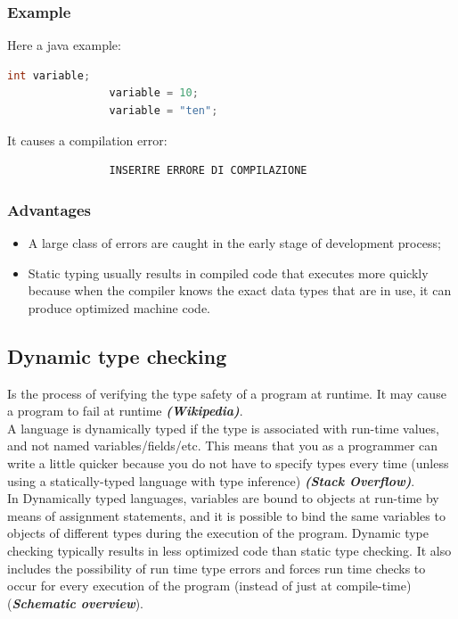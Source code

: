 \documentclass[12pt]{article}
\begin{document}
		\subsubsection{Example}	
			Here a java example: 
			\begin{lstlisting}[language=Java]
				int variable;
				variable = 10;
				variable = "ten";
			\end{lstlisting}
			It causes a compilation error:
			\begin{lstlisting}
				INSERIRE ERRORE DI COMPILAZIONE
			\end{lstlisting}
			
		\subsubsection{Advantages}
			\begin{itemize}
				\item  A large class of errors are caught in the early stage of development process;
				\item Static typing usually results in compiled code that executes more quickly because when the compiler knows the exact data types that are in use, it can produce optimized machine code.
			\end{itemize}
			
	\subsection{Dynamic type checking}
		Is the process of verifying the type safety of a program at runtime. It may cause a program to fail at runtime \textit{\textbf{(Wikipedia)}}.\\
		A language is dynamically typed if the type is associated with run-time values, and not named variables/fields/etc. This means that you as a programmer can write a little quicker because you do not have to specify types every time (unless using a statically-typed language with type inference) \textit{\textbf{(Stack Overflow)}}.\\
		In Dynamically typed languages, variables are bound to objects at run-time by means of assignment statements, and it is possible to bind the same variables to objects of different types during the execution of the program.
		Dynamic type checking typically results in less optimized code than static type checking. It also includes the possibility of run time type errors and forces run time checks to occur for every execution of the program (instead of just at compile-time) (\textbf{\textit{Schematic overview}}).\\
		
\end{document}
